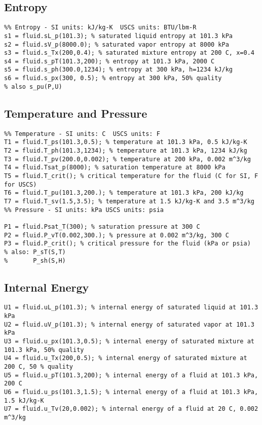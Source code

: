 \subsection{Entropy}
\begin{fullwidth}
\begin{lstlisting}
%% Entropy - SI units: kJ/kg-K  USCS units: BTU/lbm-R
s1 = fluid.sL_p(101.3); % saturated liquid entropy at 101.3 kPa
s2 = fluid.sV_p(8000.0); % saturated vapor entropy at 8000 kPa 
s3 = fluid.s_Tx(200,0.4); % saturated mixture entropy at 200 C, x=0.4
s4 = fluid.s_pT(101.3,200); % entropy at 101.3 kPa, 2000 C
s5 = fluid.s_ph(300.0,1234); % entropy at 300 kPa, h=1234 kJ/kg
s6 = fluid.s_px(300, 0.5); % entropy at 300 kPa, 50% quality
% also s_pu(P,U)
\end{lstlisting}
\end{fullwidth}

\subsection{Temperature and Pressure}
\begin{fullwidth}
\begin{lstlisting}
%% Temperature - SI units: C  USCS units: F
T1 = fluid.T_ps(101.3,0.5); % temperature at 101.3 kPa, 0.5 kJ/kg-K
T2 = fluid.T_ph(101.3,1234); % temperature at 101.3 kPa, 1234 kJ/kg
T3 = fluid.T_pv(200.0,0.002); % temperature at 200 kPa, 0.002 m^3/kg
T4 = fluid.Tsat_p(8000); % saturation temperature at 8000 kPa
T5 = fluid.T_crit(); % critical temperature for the fluid (C for SI, F for USCS)
T6 = fluid.T_pu(101.3,200.); % temperature at 101.3 kPa, 200 kJ/kg 
T7 = fluid.T_sv(1.5,3.5); % temperature at 1.5 kJ/kg-K and 3.5 m^3/kg
%% Pressure - SI units: kPa USCS units: psia

P1 = fluid.Psat_T(300); % saturation pressure at 300 C 
P2 = fluid.P_vT(0.002,300.); % pressure at 0.002 m^3/kg, 300 C
P3 = fluid.P_crit(); % critical pressure for the fluid (kPa or psia)
% also: P_sT(S,T)
%       P_sh(S,H)

\end{lstlisting}
\end{fullwidth}

\subsection{Internal Energy}
\begin{fullwidth}
\begin{lstlisting}
U1 = fluid.uL_p(101.3); % internal energy of saturated liquid at 101.3 kPa
U2 = fluid.uV_p(101.3); % internal energy of saturated vapor at 101.3 kPa
U3 = fluid.u_px(101.3,0.5); % internal energy of saturated mixture at 101.3 kPa, 50% quality
U4 = fluid.u_Tx(200,0.5); % internal energy of saturated mixture at 200 C, 50 % quality
U5 = fluid.u_pT(101.3,200); % internal energy of a fluid at 101.3 kPa, 200 C
U6 = fluid.u_ps(101.3,1.5); % internal energy of a fluid at 101.3 kPa, 1.5 kJ/kg-K
U7 = fluid.u_Tv(20,0.002); % internal energy of a fluid at 20 C, 0.002 m^3/kg
\end{lstlisting}
\end{fullwidth}

